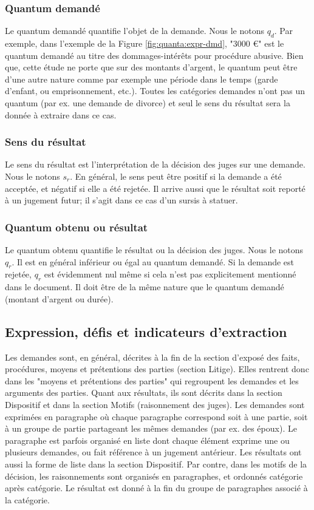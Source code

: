 \subsubsection{Quantum demandé}

Le quantum demandé quantifie l'objet de la demande. Nous le notons $q_d$. Par exemple, dans l'exemple de la Figure \ref{fig:quanta:expr-dmd}, "3000 \euro{}" est le quantum demandé au titre des dommages-intérêts pour procédure abusive. Bien que, cette étude ne porte que sur des montants d'argent, le quantum peut être d'une autre nature comme par exemple une période dans le temps (garde d'enfant, ou emprisonnement, etc.). Toutes les catégories demandes n'ont pas un quantum (par ex. une demande de divorce) et seul le sens du résultat sera la donnée à extraire dans ce cas.

\subsubsection{Sens du résultat}

Le sens du résultat est l'interprétation de la décision des juges sur une demande. Nous le notons $s_r$. En général, le sens peut être positif si la demande a été acceptée, et négatif si elle a été rejetée. Il arrive aussi que le résultat soit reporté à un jugement futur; il s'agit dans ce cas d'un sursis à statuer. 

\subsubsection{Quantum obtenu ou résultat}

Le quantum obtenu quantifie le résultat ou la décision des juges. Nous le notons $q_r$. Il est en général inférieur ou égal au quantum demandé. Si la demande est rejetée, 
$q_r$ est évidemment nul même si cela n'est pas explicitement mentionné dans le document. Il doit être de la même nature que le quantum demandé (montant d'argent ou durée).


\subsection{Expression, défis et indicateurs d'extraction}

Les demandes sont, en général, décrites à la fin de la section d'exposé des faits, procédures, moyens et prétentions des parties (section Litige). Elles rentrent donc dans les "moyens et prétentions des parties" qui regroupent les demandes et les arguments des parties. Quant aux résultats, ils sont décrits dans la section Dispositif et dans la section Motifs (raisonnement des juges). Les demandes sont exprimées en paragraphe où chaque paragraphe correspond soit à une partie, soit à un groupe de partie partageant les mêmes demandes (par ex. des époux). Le paragraphe est parfois organisé en liste dont chaque élément exprime une ou plusieurs demandes, ou fait référence à un jugement antérieur. Les résultats ont aussi la forme de liste dans la section Dispositif. Par contre, dans les motifs de la décision, les raisonnements sont organisés en paragraphes, et ordonnés catégorie après catégorie. Le résultat est donné à la fin du groupe de paragraphes associé à la catégorie.


